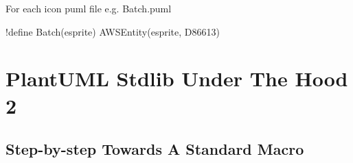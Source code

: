 \documentclass[letterpaper,10pt,english]{sphinxmanual}
\begin{document}
For each icon puml file e.g. Batch.puml

\begin{sphinxVerbatim}[commandchars=\\\{\}]
!define Batch(e\PYGZus{}sprite) AWSEntity(e\PYGZus{}sprite, \PYGZsh{}D86613)
\end{sphinxVerbatim}


\section{PlantUML Stdlib Under The Hood 2}
\label{\detokenize{Stdlib/StandardisingStdLib:plantuml-stdlib-under-the-hood-2}}\label{\detokenize{Stdlib/StandardisingStdLib::doc}}

\subsection{Step-by-step Towards A Standard Macro}
\label{\detokenize{Stdlib/StandardisingStdLib:step-by-step-towards-a-standard-macro}}
\begin{figure}[htbp]
\centering
\capstart

\caption{}\label{\detokenize{Stdlib/StandardisingStdLib:id3}}\end{figure}
\end{document}

